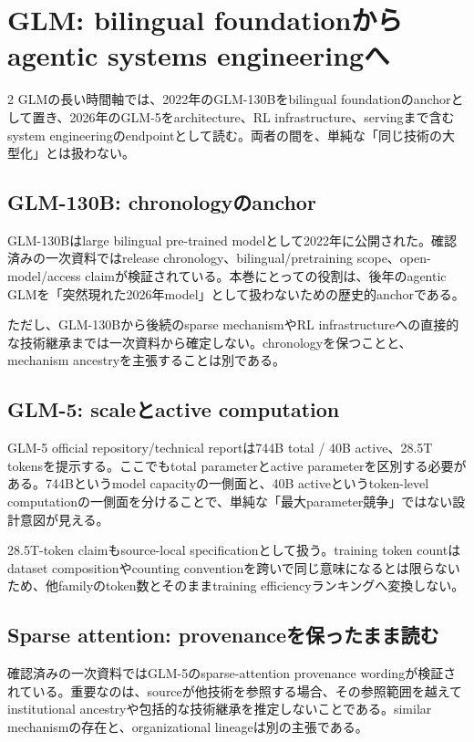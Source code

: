 \documentclass[lualatex,a4paper,10pt]{jlreq}
\begin{document}
\section{GLM: bilingual foundationからagentic systems engineeringへ}
\label{sec:glm}

\begin{multicols}{2}
\raggedcolumns
GLMの長い時間軸では、2022年のGLM-130Bをbilingual foundationのanchorとして置き、2026年のGLM-5をarchitecture、RL infrastructure、servingまで含むsystem engineeringのendpointとして読む。両者の間を、単純な「同じ技術の大型化」とは扱わない。\autocite{glm130b,glm5}

\subsection{GLM-130B: chronologyのanchor}
GLM-130Bはlarge bilingual pre-trained modelとして2022年に公開された。確認済みの一次資料ではrelease chronology、bilingual/pretraining scope、open-model/access claimが検証されている。本巻にとっての役割は、後年のagentic GLMを「突然現れた2026年model」として扱わないための歴史的anchorである。\autocite{glm130b}

ただし、GLM-130Bから後続のsparse mechanismやRL infrastructureへの直接的な技術継承までは一次資料から確定しない。chronologyを保つことと、mechanism ancestryを主張することは別である。

\subsection{GLM-5: scaleとactive computation}
GLM-5 official repository/technical reportは744B total / 40B active、28.5T tokensを提示する。ここでもtotal parameterとactive parameterを区別する必要がある。744Bというmodel capacityの一側面と、40B activeというtoken-level computationの一側面を分けることで、単純な「最大parameter競争」ではない設計意図が見える。\autocite{glm5}

28.5T-token claimもsource-local specificationとして扱う。training token countはdataset compositionやcounting conventionを跨いで同じ意味になるとは限らないため、他familyのtoken数とそのままtraining efficiencyランキングへ変換しない。

\subsection{Sparse attention: provenanceを保ったまま読む}
確認済みの一次資料ではGLM-5のsparse-attention provenance wordingが検証されている。重要なのは、sourceが他技術を参照する場合、その参照範囲を越えてinstitutional ancestryや包括的な技術継承を推定しないことである。similar mechanismの存在と、organizational lineageは別の主張である。\autocite{glm5}


\end{multicols}
\end{document}
